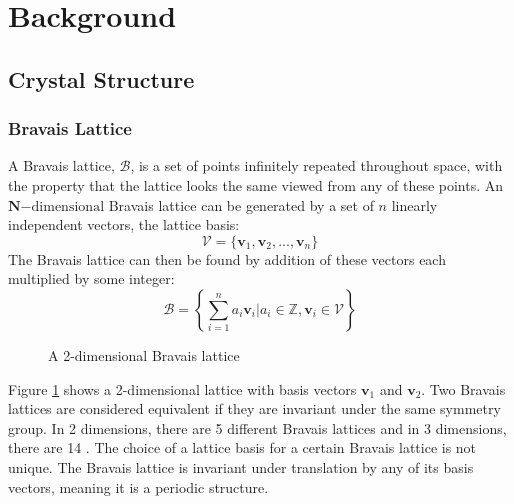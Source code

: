 \documentclass[12pt]{article}
\begin{document}
\section{Background}
\subsection{Crystal Structure}
\subsubsection{Bravais Lattice}
A Bravais lattice, $\mathcal{B}$, is a set of points infinitely repeated throughout space, with the property that the lattice looks the same viewed from any of these points. 
An $\mathbf{N}\mathrm{-dimensional}$ Bravais lattice can be generated by a set of $n$ linearly independent vectors, the lattice basis:
\begin{equation}\label{eq:lattice_basis}
	\mathcal{V} = \{\mathbf{v}_1, \mathbf{v}_2, ..., \mathbf{v}_n\}
\end{equation}
The Bravais lattice can then be found by addition of these vectors each multiplied by some integer:
\begin{equation}\label{eq:bravais_lattice}
	\mathcal{B} = \left \{\sum_{i=1}^n a_i\mathbf{v}_i \Big | a_i \in \mathbb{Z}, \mathbf{v}_i \in \mathcal{V}  \right \}
\end{equation}

\begin{figure}
\centering
{}
\caption{A 2-dimensional Bravais lattice}
\label{fig:lattice_basis}
\end{figure}

Figure \ref{fig:lattice_basis} shows a 2-dimensional lattice with basis vectors $\mathbf{v}_1$ and $\mathbf{v}_2$. Two Bravais lattices are considered equivalent if they are invariant under the same symmetry group. In 2 dimensions, there are 5 different Bravais lattices and in 3 dimensions, there are 14 \cite{kittel2005introduction}. The choice of a lattice basis for a certain Bravais lattice is not unique.
The Bravais lattice is invariant under translation by any of its basis vectors, meaning it is a periodic structure. 
\end{document}
